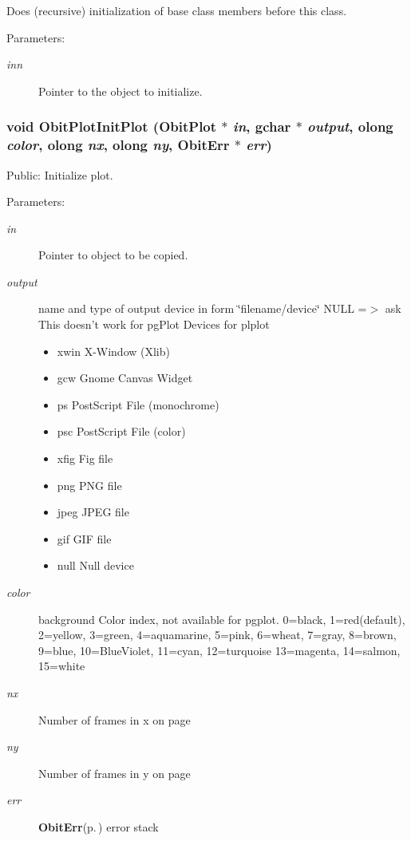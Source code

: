 Does (recursive) initialization of base class members before this class. \begin{Desc}
\item[Parameters:]
\begin{description}
\item[{\em inn}]Pointer to the object to initialize. \end{description}
\end{Desc}
\subsubsection{\setlength{\rightskip}{0pt plus 5cm}void Obit\-Plot\-Init\-Plot ({\bf Obit\-Plot} $\ast$ {\em in}, gchar $\ast$ {\em output}, {\bf olong} {\em color}, {\bf olong} {\em nx}, {\bf olong} {\em ny}, {\bf Obit\-Err} $\ast$ {\em err})}\label{ObitPlot_8c_a8}


Public: Initialize plot. 

\begin{Desc}
\item[Parameters:]
\begin{description}
\item[{\em in}]Pointer to object to be copied. \item[{\em output}]name and type of output device in form \char`\"{}filename/device\char`\"{} NULL =$>$ ask This doesn't work for pg\-Plot Devices for plplot \begin{itemize}
\item xwin X-Window (Xlib) \item gcw Gnome Canvas Widget \item ps Post\-Script File (monochrome) \item psc Post\-Script File (color) \item xfig Fig file \item png PNG file \item jpeg JPEG file \item gif GIF file \item null Null device \end{itemize}
\item[{\em color}]background Color index, not available for pgplot. 0=black, 1=red(default), 2=yellow, 3=green, 4=aquamarine, 5=pink, 6=wheat, 7=gray, 8=brown, 9=blue, 10=Blue\-Violet, 11=cyan, 12=turquoise 13=magenta, 14=salmon, 15=white \item[{\em nx}]Number of frames in x on page \item[{\em ny}]Number of frames in y on page \item[{\em err}]{\bf Obit\-Err}{\rm (p.\,\pageref{structObitErr})} error stack \end{description}
\end{Desc}
